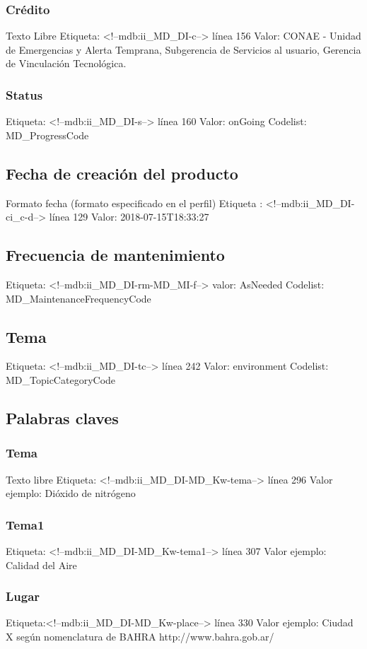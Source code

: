 \documentclass{GVT_CONAE_Class}
\begin{document}
\subsubsection{Crédito}
Texto Libre
Etiqueta: <!--mdb:ii\_MD\_DI-c--> línea 156
Valor: CONAE - Unidad de Emergencias y Alerta Temprana, Subgerencia de Servicios al usuario, Gerencia de Vinculación Tecnológica. 

\subsubsection{Status}
Etiqueta: <!--mdb:ii\_MD\_DI-s--> línea 160
Valor: onGoing
Codelist: MD\_ProgressCode

\subsection{Fecha de creación del producto}
Formato fecha (formato especificado en el perfil)
Etiqueta : <!--mdb:ii\_MD\_DI-ci\_c-d--> línea 129
Valor: 2018-07-15T18:33:27

\subsection{Frecuencia de mantenimiento}
Etiqueta: <!--mdb:ii\_MD\_DI-rm-MD\_MI-f-->
valor: AsNeeded
Codelist: MD\_MaintenanceFrequencyCode

\subsection{Tema}
Etiqueta: <!--mdb:ii\_MD\_DI-tc--> línea 242
Valor: environment
Codelist: MD\_TopicCategoryCode

\subsection{Palabras claves}
\subsubsection{Tema}
Texto libre
Etiqueta: <!--mdb:ii\_MD\_DI-MD\_Kw-tema-->  línea 296
Valor ejemplo: Dióxido de nitrógeno

\subsubsection{Tema1}
Etiqueta: <!--mdb:ii\_MD\_DI-MD\_Kw-tema1--> línea 307
Valor ejemplo: Calidad del Aire

\subsubsection{Lugar}
Etiqueta:<!--mdb:ii\_MD\_DI-MD\_Kw-place--> línea 330
Valor ejemplo: Ciudad X según nomenclatura de BAHRA http://www.bahra.gob.ar/
\end{document}
